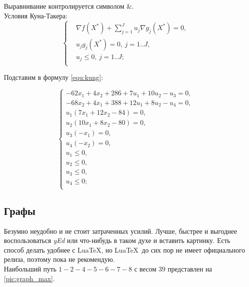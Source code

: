 Выравнивание контролируется символом \&. \\

Условия Куна-Такера:
\begin{equation}
	\left\{\begin{aligned}
		&\nabla f(X^*)+\sum_{j=1}^{J} u_j \nabla g_j(X^*)=0,\\
		&u_j g_j(X^*)=0,~ j=1..J,\\
		&u_j \leq 0,~ j=1..J;\\
	\end{aligned}\right.
	\label{equ:kung}
\end{equation}

Подставим в формулу \ref{equ:kung}:

\begin{equation}
	\left\{\begin{aligned}
		-62x_1+4x_2+286+7u_1+10u_2-u_3=0,\\
		-68x_2+4x_1+388+12u_1+8u_2-u_4=0,\\
		u_1(7x_1+12x_2-84)=0,\\
		u_2(10x_1+8x_2-80)=0,\\
		u_3(-x_1)=0,\\
		u_4(-x_2)=0,\\
		u_1\leq 0,\\
		u_2\leq 0,\\
		u_3\leq 0,\\
		u_4\leq 0;\\
	\end{aligned}\right.
\end{equation}

\subsection{Графы}

Безумно неудобно и не стоит затраченных усилий. Лучше, быстрее и выгоднее воспользоваться \emph{yEd} или что-нибудь в таком духе и вставить картинку. Есть способ делать удобнее с Lua\TeX, но Lua\TeX~до сих пор не имеет официального релиза, поэтому пока не рекомендую. \\

Наибольший путь $1-2-4-5-6-7-8$ с весом $39$ представлен на \ref{pic:graph_max}.

